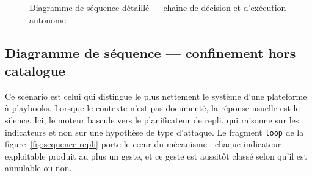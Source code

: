 \begin{figure}
{\begin{diagramme}

\end{diagramme}}
\caption{Diagramme de s\'equence d\'etaill\'e --- cha\^ine de d\'ecision et d'ex\'ecution autonome}
\label{fig:sequence-detail}
\end{figure}

\subsection{Diagramme de s\'equence --- confinement hors catalogue}
Ce sc\'enario est celui qui distingue le plus nettement le syst\`eme d'une plateforme
\`a playbooks. Lorsque le contexte n'est pas document\'e, la r\'eponse usuelle est le
silence. Ici, le moteur bascule vers le planificateur de repli, qui raisonne sur
les indicateurs et non sur une hypoth\`ese de type d'attaque. Le fragment
\texttt{loop} de la figure~\ref{fig:sequence-repli} porte le c\oe ur du m\'ecanisme :
chaque indicateur exploitable produit au plus un geste, et ce geste est aussit\^ot
class\'e selon qu'il est annulable ou non.

